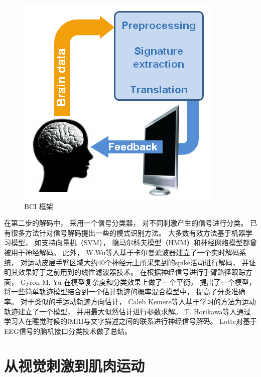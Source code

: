 \begin{figure}[htb]
\centering
\includegraphics[scale=0.8]{Pictures/Chap1/bci_cycle_v2-2.png}
\caption{BCI 框架}
\label{Fig:bci_brief}
\end{figure}

在第二步的解码中， 采用一个信号分类器， 对不同刺激产生的信号进行分类。 已有很多方法针对信号解码提出一些的模式识别方法。 大多数有效方法基于机器学习模型\cite{blankertz2006berlin,lotte2007review,muller2008machine}， 如支持向量机（SVM）\cite{}， 隐马尔科夫模型（HMM）和神经网络模型都曾被用于神经解码。 此外， W.Wu等人基于卡尔曼滤波器建立了一个实时解码系统， 对运动皮层手臂区域大约40个神经元上所采集到的spike活动进行解码， 并证明其效果好于之前用到的线性滤波器技术\cite{wu2003neural}。 在根据神经信号进行手臂路径跟踪方面， Gyron M. Yu 在模型复杂度和分类效果上做了一个平衡， 提出了一个模型， 将一些简单轨迹模型结合到一个估计轨迹的概率混合模型中， 提高了分类准确率\cite{byron2007mixture}。 对于类似的手运动轨迹方向估计， Caleb Kemere等人基于学习的方法为运动轨迹建立了一个模型， 并用最大似然估计进行参数求解\cite{kemere2004model}。 T. Horikawa等人通过学习人在睡觉时候的fMRI与文字描述之间的联系进行神经信号解码\cite{horikawa2013neural}。 Lotte对基于EEG信号的脑机接口分类技术做了总结\cite{lotte2007review}。


\section{从视觉刺激到肌肉运动}

